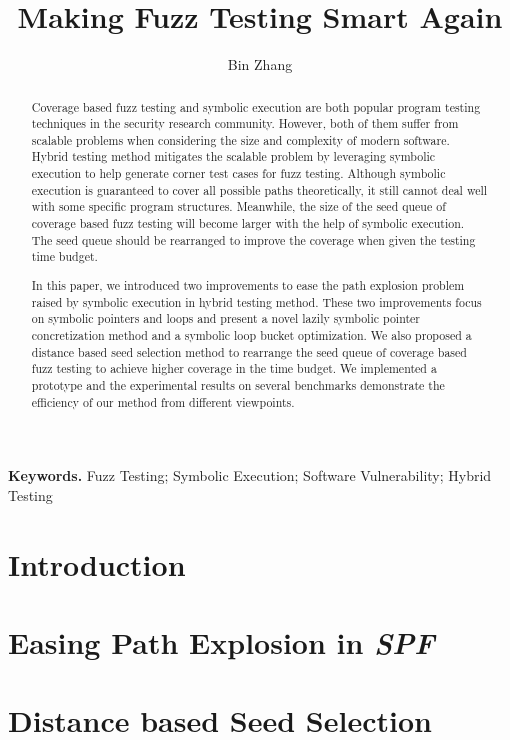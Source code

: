 \documentclass[a4paper]{article}
\begin{document}
\title{Making Fuzz Testing Smart Again}
\author{Bin Zhang}
\maketitle

\begin{abstract}
Coverage based fuzz testing and symbolic execution are both popular program testing techniques in the security research community. However, both of them suffer from scalable problems when considering the size and complexity of modern software. Hybrid testing method mitigates the scalable problem by leveraging symbolic execution to help generate corner test cases for fuzz testing. Although symbolic execution is guaranteed to cover all possible paths theoretically, it still cannot deal well with some specific program structures. Meanwhile, the size of the seed queue of coverage based fuzz testing will become larger with the help of symbolic execution. The seed queue should be rearranged to improve the coverage when given the testing time budget.

In this paper, we introduced two improvements to ease the path explosion problem raised by symbolic execution in hybrid testing method. 
These two improvements focus on symbolic pointers and loops and present a novel lazily symbolic pointer concretization method and a symbolic loop bucket optimization. 
We also proposed a distance based seed selection method to rearrange the seed queue of coverage based fuzz testing to achieve higher coverage in the time budget. We implemented a prototype and the experimental results on several benchmarks demonstrate the efficiency of our method from different viewpoints.
\end{abstract}
\textbf{Keywords.} Fuzz Testing; Symbolic Execution; Software Vulnerability; Hybrid Testing

\section{Introduction} \label{sec:introduction}


\section{Easing Path Explosion in \textit{SPF}} \label{sec:ease PE}


\section{Distance based Seed Selection} \label{sec:seed selection}

\end{document}
